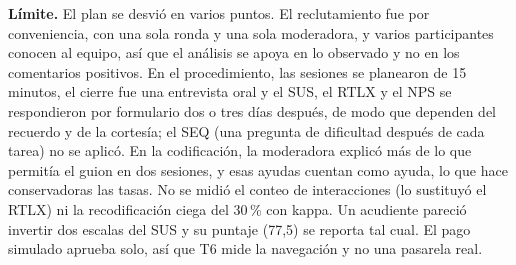 \textbf{Límite.} El plan se desvió en varios puntos. El reclutamiento fue por conveniencia, con una sola ronda y una sola moderadora, y varios participantes conocen al equipo, así que el análisis se apoya en lo observado y no en los comentarios positivos. En el procedimiento, las
sesiones se planearon de 15 minutos, el cierre fue una entrevista oral y el SUS, el RTLX y el NPS se
respondieron por formulario dos o tres días después, de modo que dependen del recuerdo y de la cortesía; el
SEQ (una pregunta de dificultad después de cada tarea) no se aplicó. En la codificación, la moderadora
explicó más de lo que permitía el guion en dos sesiones, y esas ayudas cuentan como ayuda, lo que hace conservadoras las tasas. No se midió el conteo de interacciones (lo sustituyó el RTLX) ni la recodificación ciega del 30\,\% con kappa. Un acudiente pareció invertir dos escalas del SUS y su puntaje (77,5) se reporta tal cual. El pago simulado aprueba solo, así que T6 mide la navegación y no una pasarela real.
